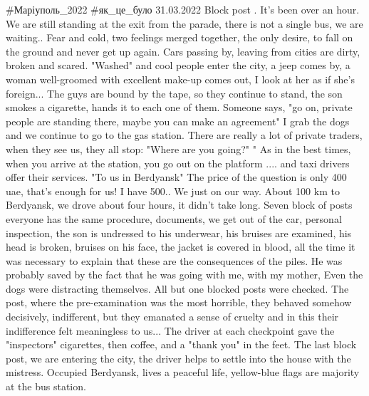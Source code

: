  
 
 
 
 

#Маріуполь_2022 #як_це_було
31.03.2022
Block post .
It's been over an hour. We are still standing at the exit from the parade, there is not a single bus, we are waiting..
Fear and cold, two feelings merged together, the only desire, to fall on the ground and never get up again.
Cars passing by, leaving from
cities are dirty, broken and scared.
"Washed" and cool people enter the city, a jeep comes by, a woman well-groomed with excellent make-up comes out, I look at her as if she's foreign...
The guys are bound by the tape, so they continue to stand, the son smokes a cigarette, hands it to each one of them.
Someone says, "go on, private people are standing there, maybe you can make an agreement"
I grab the dogs and we continue to go to the gas station. There are really a lot of private traders, when they see us, they all stop: "Where are you going?" "
As in the best times, when you arrive at the station, you go out on the platform .... and taxi drivers offer their services.
"To us in Berdyansk"
The price of the question is only 400 uae, that's enough for us! I have 500..
We just on our way.
About 100 km to Berdyansk, we drove about four hours, it didn't take long.
Seven block of posts everyone has the same procedure, documents, we get out of the car, personal inspection, the son is undressed to his underwear, his bruises are examined, his head is broken, bruises on his face, the jacket is covered in blood, all the time it was necessary to explain that these are the consequences of the piles.
He was probably saved by the fact that he was going with me, with my mother,
Even the dogs were distracting themselves.
All but one blocked posts were checked.
The post, where the pre-examination was the most horrible, they behaved somehow decisively, indifferent, but they emanated a sense of cruelty and in this their indifference felt meaningless to us...
The driver at each checkpoint gave the "inspectors" cigarettes, then coffee, and a "thank you" in the feet.
The last block post, we are entering the city, the driver helps to settle into the house with the mistress.
Occupied Berdyansk, lives a peaceful life, yellow-blue flags are majority at the bus station.
